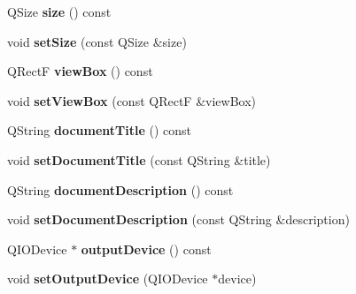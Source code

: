 \begin{DoxyCompactItemize}
\item 
\mbox{\label{class_svg_paint_engine_a2fb786d011697e7cbb49c850211c6911}} 
Q\+Size {\bfseries size} () const
\item 
\mbox{\label{class_svg_paint_engine_aba227bb93f877a8b39a07682c58cde41}} 
void {\bfseries set\+Size} (const Q\+Size \&size)
\item 
\mbox{\label{class_svg_paint_engine_ae24f95d8a830b2dd3f18419654f82d93}} 
Q\+RectF {\bfseries view\+Box} () const
\item 
\mbox{\label{class_svg_paint_engine_a8756d3fa2c52c378dc995c90bc25e4b8}} 
void {\bfseries set\+View\+Box} (const Q\+RectF \&view\+Box)
\item 
\mbox{\label{class_svg_paint_engine_a57df7197aaf7b9c8e60dc99ed6a38495}} 
Q\+String {\bfseries document\+Title} () const
\item 
\mbox{\label{class_svg_paint_engine_a12dd46439a17d9b5dc578947f22a608c}} 
void {\bfseries set\+Document\+Title} (const Q\+String \&title)
\item 
\mbox{\label{class_svg_paint_engine_a8f62a4663816b8f3c550b326ddcae66a}} 
Q\+String {\bfseries document\+Description} () const
\item 
\mbox{\label{class_svg_paint_engine_a48fbdce28890b2cb6230d82fbf667400}} 
void {\bfseries set\+Document\+Description} (const Q\+String \&description)
\item 
\mbox{\label{class_svg_paint_engine_a70b9264726a0e5d7ebf7d861c323ba9f}} 
Q\+I\+O\+Device $\ast$ {\bfseries output\+Device} () const
\item 
\mbox{\label{class_svg_paint_engine_a413f628c0eb6a88462e1ee68c5a69d05}} 
void {\bfseries set\+Output\+Device} (Q\+I\+O\+Device $\ast$device)
\item 
\mbox{\label{class_svg_paint_engine_a0b1ba6e7e2cdb222990f64f1b0c67eaf}} 

\end{DoxyCompactItemize}
